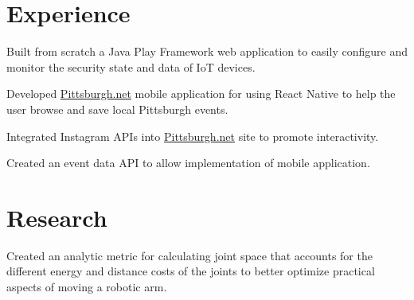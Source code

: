 \documentclass[]{openfont}
\begin{document}
\begin{minipage}[t]{0.59\textwidth} 


\section{Experience}

\vspace{\topsep} %
\begin{tightemize}
    \item Built from scratch a Java Play Framework web application to easily configure and monitor the security state and data of IoT devices.
\end{tightemize}

\vspace{\topsep} %
\begin{tightemize}
    \item Developed \href{http://www.pittsburgh.net/}{Pittsburgh.net} mobile application for using React Native to help the user browse and save local Pittsburgh events.
\end{tightemize}
\vspace{3 pt}
\begin{tightemize}
    \item Integrated Instagram APIs into \href{http://www.pittsburgh.net/}{Pittsburgh.net} site to promote interactivity.
    \item Created an event data API to allow implementation of mobile application.
\end{tightemize}

\sectionsep


\section{Research}
\begin{tightemize}
    \item Created an analytic metric for calculating joint space that accounts for the different energy and distance costs of the joints to better optimize practical aspects of moving a robotic arm.
\end{tightemize}


\end{minipage}
\end{document}
